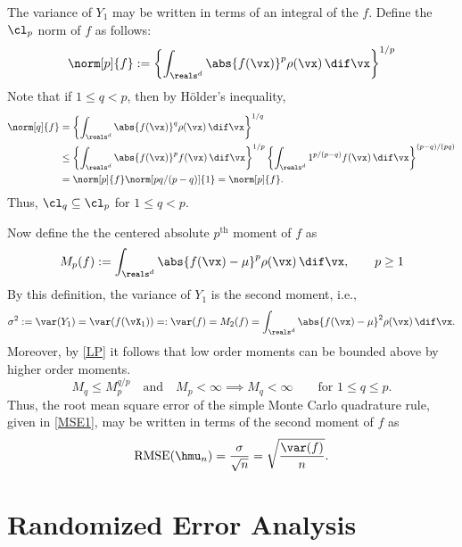 \documentclass[12pt]{amsart}
\DeclareMathOperator{\RMSE}{RMSE}
\begin{document}
The variance of $Y_1$ may be written in terms of an integral of the $f$.  Define the $\cl_{p}$ norm of $f$ as follows:
\[
\norm[p]{f} :=\left\{\int_{\reals^d} \abs{f(\vx)}^p \rho(\vx) \, \dif \vx\right\}^{1/p}
\]
Note that if $1 \le q<p$, then by H\"older's inequality,
\begin{align}\label{LP}
\norm[q]{f} &=\left\{\int_{\reals^d} \abs{f(\vx)}^q \rho(\vx) \, \dif \vx\right\}^{1/q}\\
\nonumber & \le \left\{\int_{\reals^d} \abs{f(\vx)}^p f(\vx) \, \dif \vx \right\}^{1/p} \left\{\int_{\reals^d} 1^{p/(p-q)} f(\vx) \, \dif \vx\right\}^{(p-q)/(pq)} \\
\nonumber & = \norm[p]{f} \norm[pq/(p-q)]{1} = \norm[p]{f}.
\end{align}
Thus, $\cl_q \subseteq \cl_p$ for $1 \le q<p$.  

Now define the the centered absolute $p^{\text{th}}$ moment of $f$ as
\begin{equation} \label{momentdef}
M_p(f) := \int_{\reals^d} \abs{f(\vx)-\mu}^p \rho(\vx) \, \dif \vx, \qquad p \ge 1
\end{equation}
By this definition, the variance of $Y_1$ is the second moment, i.e., 
\begin{equation} \label{sigmadef}
\sigma^2 := \var(Y_1) = \var(f(\vX_1)) =: \var(f) = M_2(f) = \int_{\reals^d} \abs{f(\vx)-\mu}^2 \rho(\vx) \, \dif \vx.
\end{equation}
Moreover, by \eqref{LP} it follows that low order moments can be bounded above by higher order moments.
\begin{equation}\label{Mineq}
M_q \le M_p^{q/p} \quad \text{and} \quad M_p < \infty \implies M_q <\infty \qquad \text{for }1 \le q \le p.
\end{equation}
Thus, the root mean square error of the simple Monte Carlo quadrature rule, given in \eqref{MSE1}, may be written in terms of the second moment of $f$ as
\begin{equation}\label{MSE2}
\RMSE(\hmu_n) = \frac{\sigma}{\sqrt{n}} = \sqrt{\frac{\var(f)}{n}}.
\end{equation}

\section{Randomized Error Analysis}
\end{document}
